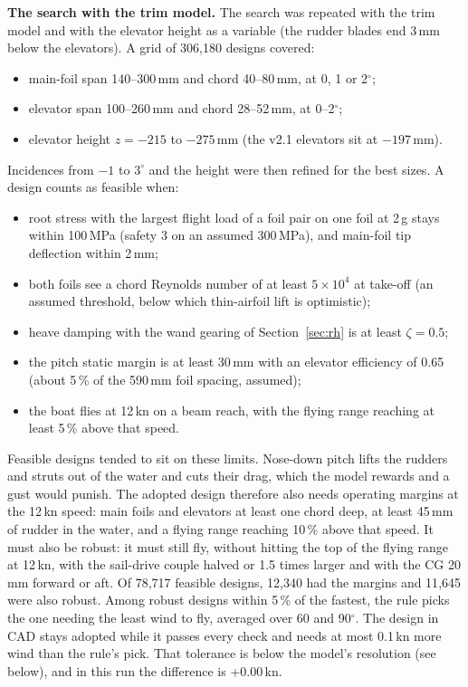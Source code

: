 \documentclass[10pt,twocolumn]{article}
\begin{document}
\noindent\textbf{The search with the trim model.} The search was repeated with the trim model and with the elevator height as a variable (the rudder blades end 3\,mm below the elevators). A grid of 306{,}180 designs covered:
\begin{itemize}\itemsep1pt
\item main-foil span 140--300\,mm and chord 40--80\,mm, at 0, 1 or 2$^\circ$;
\item elevator span 100--260\,mm and chord 28--52\,mm, at 0--2$^\circ$;
\item elevator height $z=-215$ to $-275$\,mm (the v2.1 elevators sit at $-197$\,mm).
\end{itemize}
Incidences from $-1$ to $3^\circ$ and the height were then refined for the best sizes. A design counts as feasible when:
\begin{itemize}\itemsep1pt
\item root stress with the largest flight load of a foil pair on one foil at 2\,g stays within 100\,MPa (safety 3 on an assumed 300\,MPa), and main-foil tip deflection within 2\,mm;
\item both foils see a chord Reynolds number of at least $5\times10^4$ at take-off (an assumed threshold, below which thin-airfoil lift is optimistic);
\item heave damping with the wand gearing of Section~\ref{sec:rh} is at least $\zeta=0.5$;
\item the pitch static margin is at least 30\,mm with an elevator efficiency of 0.65 (about 5\,\% of the 590\,mm foil spacing, assumed);
\item the boat flies at 12\,kn on a beam reach, with the flying range reaching at least 5\,\% above that speed.
\end{itemize}
Feasible designs tended to sit on these limits. Nose-down pitch lifts the rudders and struts out of the water and cuts their drag, which the model rewards and a gust would punish. The adopted design therefore also needs operating margins at the 12\,kn speed: main foils and elevators at least one chord deep, at least 45\,mm of rudder in the water, and a flying range reaching 10\,\% above that speed. It must also be robust: it must still fly, without hitting the top of the flying range at 12\,kn, with the sail-drive couple halved or 1.5 times larger and with the CG 20\,mm forward or aft. Of 78{,}717 feasible designs, 12{,}340 had the margins and 11{,}645 were also robust. Among robust designs within 5\,\% of the fastest, the rule picks the one needing the least wind to fly, averaged over 60 and 90$^\circ$. The design in CAD stays adopted while it passes every check and needs at most 0.1\,kn more wind than the rule's pick. That tolerance is below the model's resolution (see below), and in this run the difference is +0.00\,kn.
\end{document}
